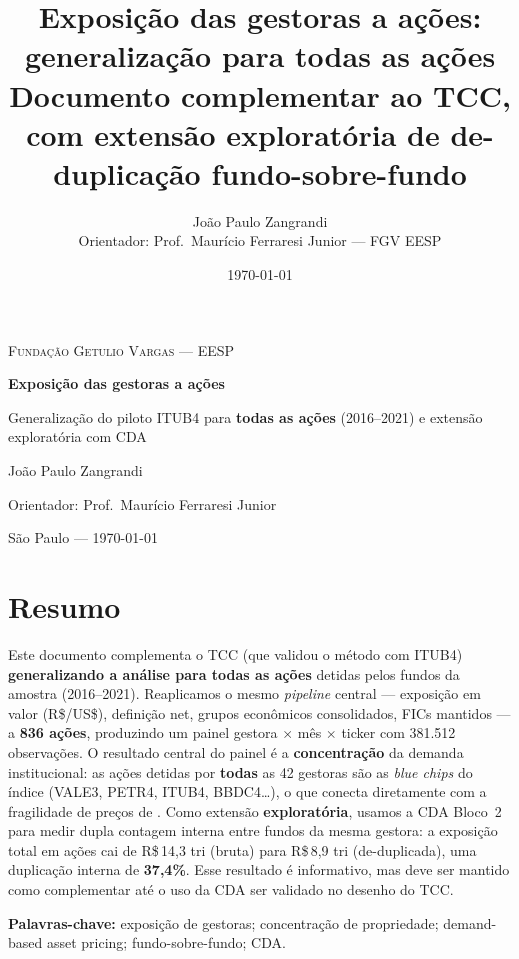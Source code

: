 \documentclass[12pt,a4paper]{article}
\title{\textbf{Exposição das gestoras a ações:\\ generalização para todas as ações} \\[0.4em]
\large Documento complementar ao TCC, com extensão exploratória de de-duplicação fundo-sobre-fundo}
\author{João Paulo Zangrandi \\ \small Orientador: Prof.\ Maurício Ferraresi Junior --- FGV EESP}
\date{\today}
\begin{document}
\begin{titlepage}
\centering
\vspace*{1.5cm}
{\scshape\large Fundação Getulio Vargas --- EESP\par}
\vspace{2.5cm}
{\huge\bfseries Exposição das gestoras a ações\par}
\vspace{0.6cm}
{\Large Generalização do piloto ITUB4 para \textbf{todas as ações} (2016--2021) e extensão exploratória com CDA\par}
\vspace{3cm}
{\Large João Paulo Zangrandi\par}
\vspace{0.4cm}
{\large Orientador: Prof.\ Maurício Ferraresi Junior\par}
\vfill
{\large São Paulo --- \today\par}
\end{titlepage}

\section*{Resumo}
Este documento complementa o TCC (que validou o método com ITUB4) \textbf{generalizando a análise para todas
as ações} detidas pelos fundos da amostra (2016--2021). Reaplicamos o mesmo \emph{pipeline} central ---
exposição em valor (R\$/US\$), definição net, grupos econômicos consolidados, FICs mantidos --- a
\textbf{836 ações}, produzindo um painel gestora $\times$ mês $\times$ ticker com 381.512 observações. O
resultado central do painel é a \textbf{concentração} da demanda institucional: as ações detidas por
\textbf{todas} as 42 gestoras são as \emph{blue chips} do índice (VALE3, PETR4, ITUB4, BBDC4\ldots), o que
conecta diretamente com a fragilidade de preços de \citet{greenwoodthesmar2011}. Como extensão
\textbf{exploratória}, usamos a CDA Bloco~2 para medir dupla contagem interna entre fundos da mesma gestora:
a exposição total em ações cai de R\$\,14,3 tri (bruta) para R\$\,8,9 tri (de-duplicada), uma duplicação
interna de \textbf{37,4\%}. Esse resultado é informativo, mas deve ser mantido como complementar até o uso da
CDA ser validado no desenho do TCC.

\noindent\textbf{Palavras-chave:} exposição de gestoras; concentração de propriedade; demand-based asset
pricing; fundo-sobre-fundo; CDA.

\newpage
\tableofcontents
\newpage
\end{document}
